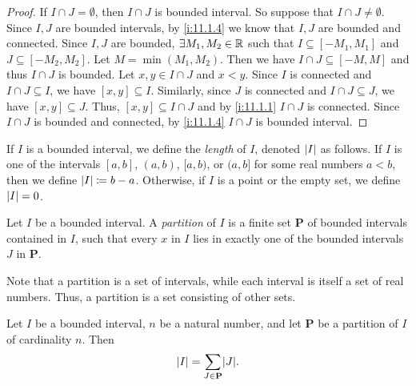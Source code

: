 \begin{proof}
  If \(I \cap J = \emptyset\), then \(I \cap J\) is bounded interval.
  So suppose that \(I \cap J \neq \emptyset\).
  Since \(I, J\) are bounded intervals, by \cref{i:11.1.4} we know that \(I, J\) are bounded and connected.
  Since \(I, J\) are bounded, \(\exists M_1, M_2 \in \mathbb{R}\) such that \(I \subseteq [-M_1, M_1]\) and \(J \subseteq [-M_2, M_2]\).
  Let \(M = \min(M_1, M_2)\).
  Then we have \(I \cap J \subseteq [-M, M]\) and thus \(I \cap J\) is bounded.
  Let \(x, y \in I \cap J\) and \(x < y\).
  Since \(I\) is connected and \(I \cap J \subseteq I\), we have \([x, y] \subseteq I\).
  Similarly, since \(J\) is connected and \(I \cap J \subseteq J\), we have \([x, y] \subseteq J\).
  Thus, \([x, y] \subseteq I \cap J\) and by \cref{i:11.1.1} \(I \cap J\) is connected.
  Since \(I \cap J\) is bounded and connected, by \cref{i:11.1.4} \(I \cap J\) is bounded interval.
\end{proof}

\setcounter{thm}{7}
\begin{defn}\label{i:11.1.8}
  If \(I\) is a bounded interval, we define the \emph{length} of \(I\), denoted \(\left\lvert I\right\rvert\) as follows.
  If \(I\) is one of the intervals \([a, b]\), \((a, b)\), \([a, b)\), or \((a, b]\) for some real numbers \(a < b\), then we define \(\left\lvert I\right\rvert \coloneqq b - a\).
  Otherwise, if \(I\) is a point or the empty set, we define \(\left\lvert I\right\rvert = 0\).
\end{defn}

\setcounter{thm}{9}
\begin{defn}[Partitions]\label{i:11.1.10}
  Let \(I\) be a bounded interval.
  A \emph{partition} of \(I\) is a finite set \(\mathbf{P}\) of bounded intervals contained in \(I\), such that every \(x\) in \(I\) lies in exactly one of the bounded intervals \(J\) in \(\mathbf{P}\).
\end{defn}

\begin{rmk}\label{i:11.1.11}
  Note that a partition is a set of intervals, while each interval is itself a set of real numbers.
  Thus, a partition is a set consisting of other sets.
\end{rmk}

\setcounter{thm}{12}
\begin{thm}\label{i:11.1.13}
  Let \(I\) be a bounded interval, \(n\) be a natural number, and let \(\mathbf{P}\) be a partition of \(I\) of cardinality \(n\).
  Then
  \[
    \abs{I} = \sum_{J \in \mathbf{P}} \abs{J}.
  \]
\end{thm}

